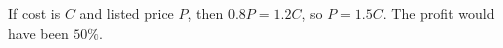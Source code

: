 If cost is $C$ and listed price $P$, then $0.8P=1.2C$, so $P=1.5C$. The profit would have been $\boxed{50\%}$.
